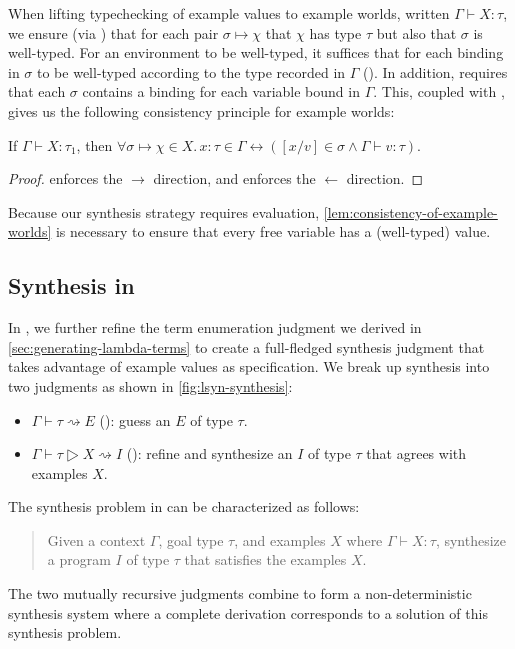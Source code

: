 When lifting typechecking of example values to example worlds, written $Γ ⊢ Χ : τ$, we ensure (via ) that for each pair $σ ↦ χ$ that $χ$ has type $τ$ but also that $σ$ is well-typed.
For an environment to be well-typed, it suffices that for each binding in $σ$ to be well-typed according to the type recorded in $Γ$ ().
In addition,  requires that each $σ$ contains a binding for each variable bound in $Γ$.
This, coupled with , gives us the following consistency principle for example worlds:
\begin{proofenv}
  \begin{lemma}
    \label{lem:consistency-of-example-worlds}
    If $Γ ⊢ Χ : τ_1$, then $∀σ ↦ χ ∈ Χ.\,x{:}τ \in Γ ↔ ([x/v] \in σ ∧ Γ ⊢ v : τ)$.
  \end{lemma}
  \begin{proof}
     enforces the $→$ direction, and  enforces the $←$ direction.
  \end{proof}
\end{proofenv}
Because our synthesis strategy requires evaluation, \autoref{lem:consistency-of-example-worlds} is necessary to ensure that every free variable has a (well-typed) value.

\subsection{Synthesis in \texorpdfstring{\lsyn{}}{λsyn}}
\label{subsec:synthesis}



In \lsyn{}, we further refine the term enumeration judgment we derived in \autoref{sec:generating-lambda-terms} to create a full-fledged synthesis judgment that takes advantage of example values as specification.
We break up synthesis into two judgments as shown in \autoref{fig:lsyn-synthesis}:
\begin{itemize}
  \item $Γ ⊢ τ ⇝ E$ (): guess an $E$ of type $τ$.
  \item $Γ ⊢ τ ▷ Χ ⇝ I$ (): refine and synthesize an $I$ of type $τ$ that agrees with examples $Χ$.
\end{itemize}
The synthesis problem in \lsyn{} can be characterized as follows:
\begin{quote}
Given a context $Γ$, goal type $τ$, and examples $Χ$ where $Γ ⊢ X : τ$, synthesize a program $I$ of type $τ$ that satisfies the examples $Χ$.
\end{quote}
The two mutually recursive judgments combine to form a non-deterministic synthesis system where a complete  derivation corresponds to a solution of this synthesis problem.

